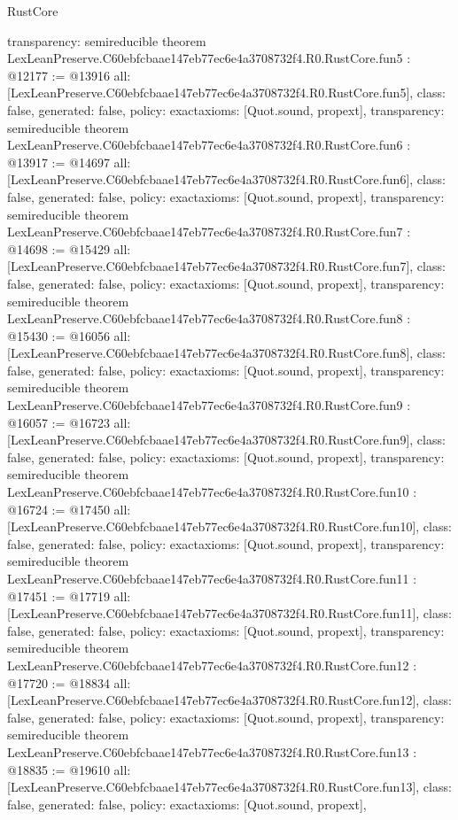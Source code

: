 \begin{lexlean}{RustCore}
\begin{coremodule}
{  transparency: semireducible
}
theorem LexLeanPreserve.C60ebfcbaae147eb77ec6e4a3708732f4.R0.RustCore.fun5 : @12177 := @13916 {
  all: [LexLeanPreserve.C60ebfcbaae147eb77ec6e4a3708732f4.R0.RustCore.fun5],
  class: false,
  generated: false,
  policy: exact{axioms: [Quot.sound, propext]},
  transparency: semireducible
}
theorem LexLeanPreserve.C60ebfcbaae147eb77ec6e4a3708732f4.R0.RustCore.fun6 : @13917 := @14697 {
  all: [LexLeanPreserve.C60ebfcbaae147eb77ec6e4a3708732f4.R0.RustCore.fun6],
  class: false,
  generated: false,
  policy: exact{axioms: [Quot.sound, propext]},
  transparency: semireducible
}
theorem LexLeanPreserve.C60ebfcbaae147eb77ec6e4a3708732f4.R0.RustCore.fun7 : @14698 := @15429 {
  all: [LexLeanPreserve.C60ebfcbaae147eb77ec6e4a3708732f4.R0.RustCore.fun7],
  class: false,
  generated: false,
  policy: exact{axioms: [Quot.sound, propext]},
  transparency: semireducible
}
theorem LexLeanPreserve.C60ebfcbaae147eb77ec6e4a3708732f4.R0.RustCore.fun8 : @15430 := @16056 {
  all: [LexLeanPreserve.C60ebfcbaae147eb77ec6e4a3708732f4.R0.RustCore.fun8],
  class: false,
  generated: false,
  policy: exact{axioms: [Quot.sound, propext]},
  transparency: semireducible
}
theorem LexLeanPreserve.C60ebfcbaae147eb77ec6e4a3708732f4.R0.RustCore.fun9 : @16057 := @16723 {
  all: [LexLeanPreserve.C60ebfcbaae147eb77ec6e4a3708732f4.R0.RustCore.fun9],
  class: false,
  generated: false,
  policy: exact{axioms: [Quot.sound, propext]},
  transparency: semireducible
}
theorem LexLeanPreserve.C60ebfcbaae147eb77ec6e4a3708732f4.R0.RustCore.fun10 : @16724 := @17450 {
  all: [LexLeanPreserve.C60ebfcbaae147eb77ec6e4a3708732f4.R0.RustCore.fun10],
  class: false,
  generated: false,
  policy: exact{axioms: [Quot.sound, propext]},
  transparency: semireducible
}
theorem LexLeanPreserve.C60ebfcbaae147eb77ec6e4a3708732f4.R0.RustCore.fun11 : @17451 := @17719 {
  all: [LexLeanPreserve.C60ebfcbaae147eb77ec6e4a3708732f4.R0.RustCore.fun11],
  class: false,
  generated: false,
  policy: exact{axioms: [Quot.sound, propext]},
  transparency: semireducible
}
theorem LexLeanPreserve.C60ebfcbaae147eb77ec6e4a3708732f4.R0.RustCore.fun12 : @17720 := @18834 {
  all: [LexLeanPreserve.C60ebfcbaae147eb77ec6e4a3708732f4.R0.RustCore.fun12],
  class: false,
  generated: false,
  policy: exact{axioms: [Quot.sound, propext]},
  transparency: semireducible
}
theorem LexLeanPreserve.C60ebfcbaae147eb77ec6e4a3708732f4.R0.RustCore.fun13 : @18835 := @19610 {
  all: [LexLeanPreserve.C60ebfcbaae147eb77ec6e4a3708732f4.R0.RustCore.fun13],
  class: false,
  generated: false,
  policy: exact{axioms: [Quot.sound, propext]},
}
\end{coremodule}
\end{lexlean}
